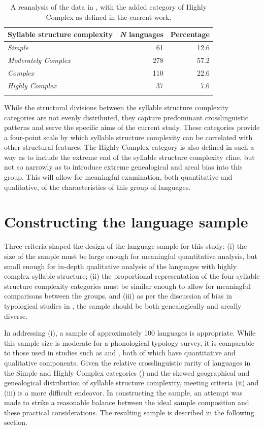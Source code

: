 \begin{table}
\begin{tabular}{lrr}
\lsptoprule
Syllable structure complexity & {\textit{N}} {languages} & {Percentage}\\\midrule
\textit{Simple} & 61 & 12.6\\
\textit{Moderately Complex} & 278 & 57.2\\
\textit{Complex} & 110 & 22.6\\
\textit{Highly Complex} & 37 & 7.6\\
\lspbottomrule
\end{tabular}
\caption{\label{tab:2.3}A reanalysis of the data in \citet{Maddieson2013a}, with the added category of Highly Complex as defined in the current work.}
\end{table}

  While the structural divisions between the syllable structure complexity categories are not evenly distributed, they capture predominant crosslinguistic patterns and serve the specific aims of the current study. These categories provide a four-point scale by which syllable structure complexity can be correlated with other structural features. The Highly Complex category is also defined in such a way as to include the extreme end of the syllable structure complexity cline, but not so narrowly as to introduce extreme genealogical and areal bias into this group. This will allow for meaningful examination, both quantitative and qualitative, of the characteristics of this group of languages.

\section{Constructing the language sample}\label{sec:2.3}

  Three criteria shaped the design of the language sample for this study: (i) the size of the sample must be large enough for meaningful quantitative analysis, but small enough for in-depth qualitative analysis of the languages with highly complex syllable structure; (ii) the proportional representation of the four syllable structure complexity categories must be similar enough to allow for meaningful comparisons between the groups, and (iii) as per the discussion of bias in typological studies in , the sample should be both genealogically and areally diverse.

  In addressing (i), a sample of approximately 100 languages is appropriate. While this sample size is moderate for a phonological typology survey, it is comparable to those used in studies such as \citet{Bateman2007} and \citet{BybeeEasterday2019}, both of which have quantitative and qualitative components. Given the relative crosslinguistic rarity of languages in the Simple and Highly Complex categories () and the skewed geographical and genealogical distribution of syllable structure complexity, meeting criteria (ii) and (iii) is a more difficult endeavor. In constructing the sample, an attempt was made to strike a reasonable balance between the ideal sample composition and these practical considerations. The resulting sample is described in the following section.
 
